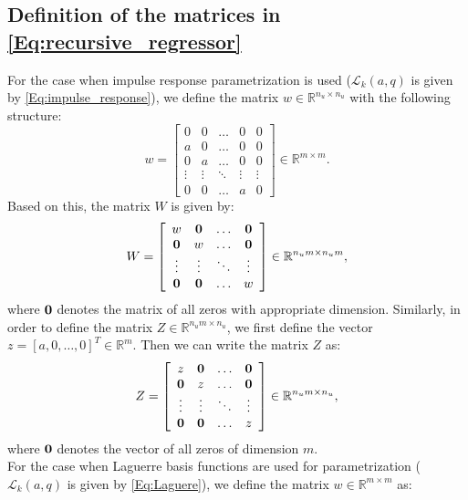 \documentclass[10 pt, letterpaper]{article}
\newcommand{\ba}{\begin{array}}
\newcommand{\ea}{\end{array}}
\newcommand{\bR}{{\mathbb R}}
\begin{document}
\subsection{Definition of the matrices in \eqref{Eq:recursive_regressor}} \label{S:Matrices_reg}        %
For the case when impulse response parametrization is used ($\mathcal{L}_k(a,q)$ is given by \eqref{Eq:impulse_response}), we define the matrix $w\in \bR^{n_u \times n_u}$ with the following structure:
\begin{equation*}
w=\left[ \ba{ccccc} 0 & 0 & \hdots & 0 & 0\\
                                a & 0 & \hdots & 0 & 0\\
                                0 & a & \hdots & 0 & 0\\
                                \vdots & \vdots & \ddots & \vdots & \vdots\\
                               0 & 0 & \hdots & a & 0
\ea \right] \in \bR^{m\times m}.
\end{equation*}
Based on this, the matrix $W$ is given by:
\begin{equation}\label{Eq:W}
W=\left[\ba{cccc} w &\bold{0} & \hdots & \bold{0}\\
              \bold{0} & w & \hdots & \bold{0}\\
              \vdots & \vdots & \ddots & \vdots\\
               \bold{0} & \bold{0} & \hdots & w
\ea\right] \in \bR^{n_um \times n_um},
\end{equation}
where $\bold{0}$ denotes the matrix of all zeros with appropriate dimension.
Similarly, in order to define the matrix $Z\in \bR^{n_um\times n_u}$, we first define the vector $z=[a,0,\hdots,0]^T\in \bR^m$. Then we can write the matrix $Z$ as:
\begin{equation}\label{Eq:Z}
Z=\left[\ba{cccc} z & \bold{0} & \hdots & \bold{0}\\
                             \bold{0} & z & \hdots & \bold {0}\\
                              \vdots & \vdots & \ddots & \vdots \\
                              \bold{0} & \bold{0} & \hdots & z \ea   \right]\in \bR^{n_um\times n_u},
\end{equation}
where $\bold{0}$ denotes the vector of all zeros of dimension $m$.\\
For the case when Laguerre basis functions are used for parametrization ($\mathcal{L}_k(a,q)$ is given by \eqref{Eq:Laguere}), we define the matrix $w \in \bR^{m\times m}$ as:
\end{document}
